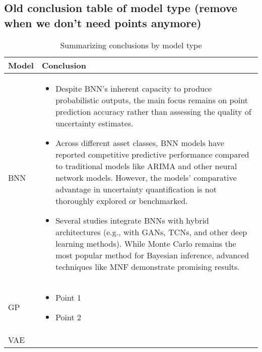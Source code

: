 \subsection{Old conclusion table of model type (remove when we don't need points anymore)}
\begin{table}[H]
    \centering
    \caption[Summarizing conclusions by model type]{Summarizing conclusions by model type}
    \label{table:conclusions_by_model}
    \small
    \begin{adjustbox}{width=1\textwidth,center}
    \begin{tabular}{p{}p{}}
        \toprule
        \textbf{Model} & \textbf{Conclusion} \\
        \midrule
        BNN & 
        \begin{itemize}[left=0pt]
        \vspace{-4mm}
            \item Despite BNN's inherent capacity to produce probabilistic outputs, the main focus remains on point prediction accuracy rather than assessing the quality of uncertainty estimates.
            \item Across different asset classes, BNN models have reported competitive predictive performance compared to traditional models like ARIMA and other neural network models. However, the models' comparative advantage in uncertainty quantification is not thoroughly explored or benchmarked.
            \item Several studies integrate BNNs with hybrid architectures (e.g., with GANs, TCNs, and other deep learning methods). While Monte Carlo remains the most popular method for Bayesian inference, advanced techniques like MNF demonstrate promising results.
        \end{itemize} \\
        \hdashline[0.2pt/3pt]
        \addlinespace
        GP & 
        \begin{itemize}[left=0pt]
        \vspace{-4mm}
            \item Point 1
            \item Point 2
        \end{itemize} \\
        \addlinespace
        \hdashline[0.2pt/3pt]
        \addlinespace
        VAE & 
        \begin{itemize}[left=0pt]
        \vspace{-4mm}

\end{itemize}
\end{tabular}
\end{adjustbox}
\end{table}
